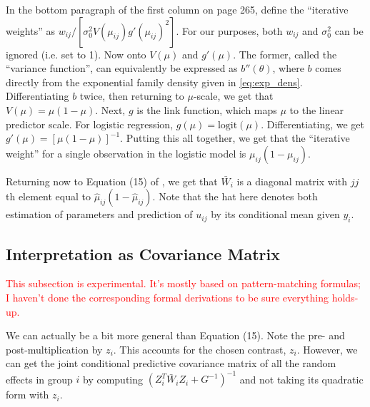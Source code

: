 \documentclass{article}
\newcommand{\logit}{\mathrm{logit}}
\begin{document}
In the bottom paragraph of the first column on page 265, \citeauthor{Boo98} define the ``iterative weights'' as $w_{ij}/ \left[ \sigma_0^2 V(\mu_{ij}) g'(\mu_{ij})^2 \right]$. For our purposes, both $w_{ij}$ and $\sigma_0^2$ can be ignored (i.e. set to 1). Now onto $V(\mu)$ and $g'(\mu)$. The former, called the ``variance function'', can equivalently be expressed as $b''(\theta)$, where $b$ comes directly from the exponential family density given in \eqref{eq:exp_dens}. Differentiating $b$ twice, then returning to $\mu$-scale, we get that $V(\mu) = \mu (1 - \mu)$. Next, $g$ is the link function, which maps $\mu$ to the linear predictor scale. For logistic regression, $g(\mu) = \logit(\mu)$. Differentiating, we get $g'(\mu) = [\mu (1 - \mu)]^{-1}$. Putting this all together, we get that the ``iterative weight'' for a single observation in the logistic model is $\mu_{ij} (1 - \mu_{ij})$.

Returning now to Equation (15) of \citeauthor{Boo98}, we get that $\bar{W}_i$ is a diagonal matrix with $jj$th element equal to $\hat{\mu}_{ij} (1 - \hat{\mu}_{ij})$. Note that the hat here denotes both estimation of parameters and prediction of $u_{ij}$ by its conditional mean given $y_i$.

\subsection{Interpretation as Covariance Matrix}

\textcolor{red}{This subsection is experimental. It's mostly based on pattern-matching formulas; I haven't done the corresponding formal derivations to be sure everything holds-up.}

We can actually be a bit more general than Equation (15). Note the pre- and post-multiplication by $z_i$. This accounts for the chosen contrast, $z_i$. However, we can get the joint conditional predictive covariance matrix of all the random effects in group $i$ by computing $(Z_i^T \bar{W}_i Z_i + G^{-1})^{-1}$ and not taking its quadratic form with $z_i$.








\end{document}

